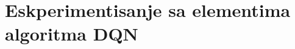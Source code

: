 \documentclass[12pt]{report}
\begin{document}
\newpage ~ \thispagestyle{empty}

\tableofcontents{}

\newpage
{}









\chapter{Eskperimentisanje sa elementima algoritma DQN}
\label{ch:eksperimenti}


\end{document}
